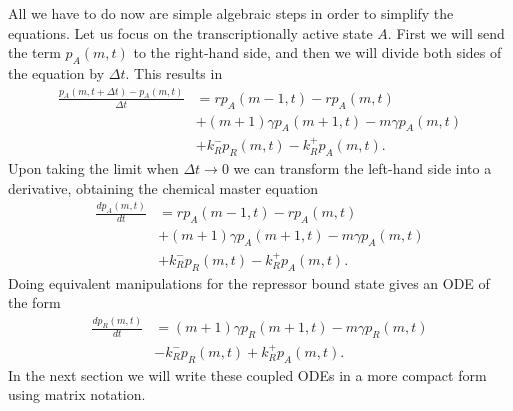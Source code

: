 All we have to do now are simple algebraic steps in order to simplify the 
equations. Let us focus on the transcriptionally active state $A$. First we will
send the term $p_A(m, t)$ to the right-hand side, and then we will divide both
sides of the equation by $\Delta t$. This results in
\begin{equation}
\begin{aligned}
\frac{p_A(m, t + \Delta t) - p_A(m, t)}{\Delta t} &=
r p_A(m-1, t) - r p_A(m, t)\\
&+ (m+1)\gamma p_A(m+1, t)
- m \gamma p_A(m, t)\\
&+k_R^- p_R(m, t)
-k_R^+ p_A(m, t).
\end{aligned}
\end{equation}
Upon taking the limit when $\Delta t \rightarrow 0$ we can transform the 
left-hand side into a derivative, obtaining the chemical master equation
\begin{equation}
\begin{aligned}
\frac{d p_A(m, t)}{dt} &=
r p_A(m-1, t) - r p_A(m, t)\\
&+ (m+1)\gamma p_A(m+1, t)
- m \gamma p_A(m, t)\\
&+k_R^- p_R(m, t)
-k_R^+ p_A(m, t).
\end{aligned}
\end{equation}
Doing equivalent manipulations for the repressor bound state gives an ODE of the
form
\begin{equation}
\begin{aligned}
\frac{d p_R(m, t)}{dt} &=
(m+1)\gamma p_R(m+1, t)
- m \gamma p_R(m, t)\\
&-k_R^- p_R(m, t)
+k_R^+ p_A(m, t).
\end{aligned}
\end{equation}
In the next section we will write these coupled ODEs in a more compact form using
matrix notation.


